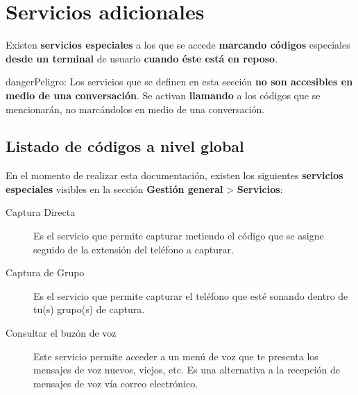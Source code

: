 \documentclass[letterpaper,10pt,spanish]{sphinxmanual}
\begin{document}
\section{Servicios adicionales}
\label{pbx_features/services:services}\label{pbx_features/services::doc}\label{pbx_features/services:servicios-adicionales}
Existen \textbf{servicios especiales} a los que se accede \textbf{marcando códigos} especiales \textbf{desde un terminal} de usuario \textbf{cuando éste está en reposo}.

\begin{notice}{danger}{Peligro:}
Los servicios que se definen en esta sección \textbf{no son accesibles en medio de una conversación}. Se activan \textbf{llamando} a los códigos que se mencionarán, no marcándolos en medio de una conversación.
\end{notice}


\subsection{Listado de códigos a nivel global}
\label{pbx_features/services:listado-de-codigos-a-nivel-global}
En el momento de realizar esta documentación, existen los siguientes \textbf{servicios especiales} visibles en la sección \textbf{Gestión general} \textgreater{} \textbf{Servicios}:

\noindent{}
\begin{description}
\item[{Captura Directa}] \leavevmode{}\label{pbx_features/services:term-captura-directa}
Es el servicio que permite capturar metiendo el código que se asigne seguido de la extensión del teléfono a capturar.

\item[{Captura de Grupo}] \leavevmode{}\label{pbx_features/services:term-captura-de-grupo}
Es el servicio que permite capturar el teléfono que esté sonando dentro de tu(s) grupo(s) de captura.

\item[{Consultar el buzón de voz}] \leavevmode{}\label{pbx_features/services:term-consultar-el-buzon-de-voz}
Este servicio permite acceder a un menú de voz que te presenta los mensajes de voz nuevos, viejos, etc. Es una alternativa a la recepción de mensajes de voz vía correo electrónico.

\end{description}
\end{document}
